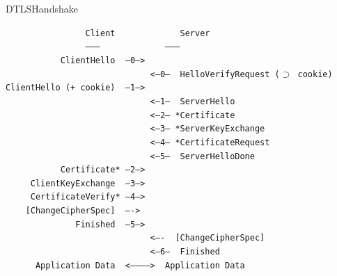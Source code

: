 \documentclass{beamer}
\begin{document}
\begin{frame}{DTLS}{Handshake}
  \begin{scriptsize}
  \tt ~~~~~~~~~~~~~~~~Client~~~~~~~~~~~~~Server\\
  \tt ~~~~~~~~~~~~~~~~---------~~~~~~~~~~~~~---------\\
  \tt ~~~~~~~~~~~ClientHello~~--0-->\\
  \tt ~~~~~~~~~~~~~~~~~~~~~~~~~~~~~<--0--~~HelloVerifyRequest~($ \supset $~cookie)\\
  \tt ClientHello~(+~cookie)~~--1-->\\
  \tt ~~~~~~~~~~~~~~~~~~~~~~~~~~~~~<--1--~~ServerHello\\
  \tt ~~~~~~~~~~~~~~~~~~~~~~~~~~~~~<--2--~*Certificate\\
  \tt ~~~~~~~~~~~~~~~~~~~~~~~~~~~~~<--3--~*ServerKeyExchange\\
  \tt ~~~~~~~~~~~~~~~~~~~~~~~~~~~~~<--4--~*CertificateRequest\\
  \tt ~~~~~~~~~~~~~~~~~~~~~~~~~~~~~<--5--~~ServerHelloDone\\
  \tt ~~~~~~~~~~~Certificate*~--2-->\\
  \tt ~~~~~ClientKeyExchange~~--3-->\\
  \tt ~~~~~CertificateVerify*~--4-->\\
  \tt ~~~~[ChangeCipherSpec]~~---->\\
  \tt ~~~~~~~~~~~~~~Finished~~--5-->\\
  \tt ~~~~~~~~~~~~~~~~~~~~~~~~~~~~~<----~~[ChangeCipherSpec]\\
  \tt ~~~~~~~~~~~~~~~~~~~~~~~~~~~~~<--6--~~Finished\\
  \tt ~~~~~~Application~Data~~<----------->~~Application~Data
  \end{scriptsize}
\end{frame}
\end{document}
